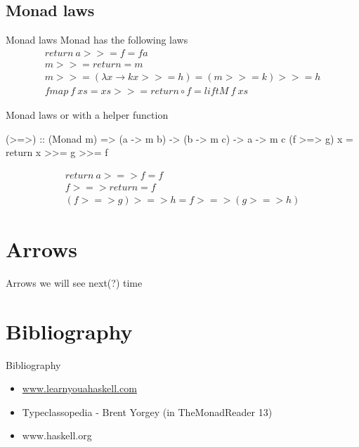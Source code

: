\documentclass{beamer}
\begin{document}
\subsection{Monad laws}
\begin{frame}[fragile]{Monad laws}
Monad has the following laws
\begin{gather*}
    return~a >>= f = f a\\
    m >>= return = m\\
    m >>= (λx → k x >>= h) = (m >>= k) >>= h\\
    fmap~f~xs = xs >>= return ∘ f = liftM~f~xs
\end{gather*}

\end{frame}
\begin{frame}[fragile]{Monad laws}
or with a helper function
\begin{code}%
    (>=>) :: (Monad m) => (a -> m b) -> (b -> m c) -> a -> m c
    (f >=> g) x = return x >>= g >>= f
\end{code}
\begin{gather*}
    return~a >=> f = f\\
    f >=> return = f\\
    (f >=> g) >=> h = f >=> (g >=> h)
\end{gather*}
\end{frame}

\section{Arrows}
\begin{frame}[fragile]{Arrows}
we will see next(?) time
\end{frame}

\section{Bibliography}
\begin{frame}[fragile]{Bibliography}
\begin{itemize}
    \item \url{www.learnyouahaskell.com}
    \item Typeclassopedia - Brent Yorgey (in TheMonadReader 13)
    \item www.haskell.org
\end{itemize}
\end{frame}
\end{document}
